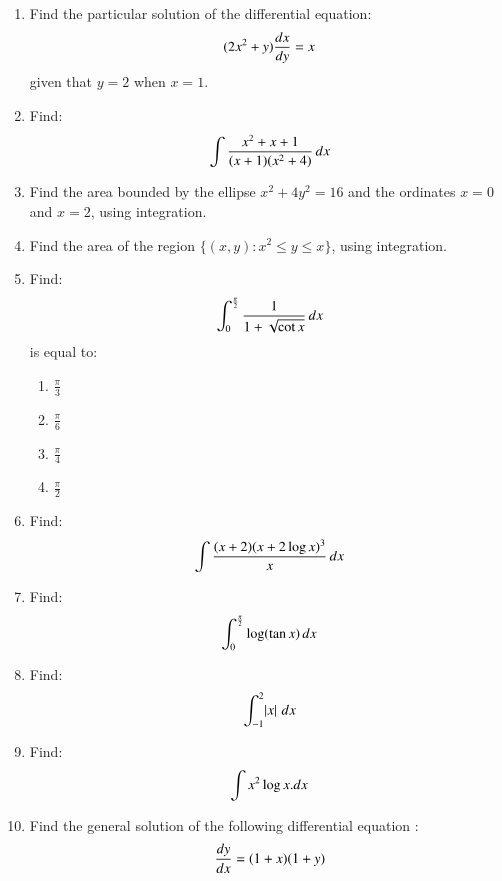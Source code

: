 \documentclass[12pt,-letter paper]{article}
\begin{document}
\begin{enumerate}
\item 
 Find the particular solution of the differential equation:
\begin{align*}
\centering
(2x^2+y) \frac{dx}{dy} = x
\end{align*}
given that $y=2$ when $x=1$.


\item 
Find:
\begin{align*}
\centering
\int \frac{x^2+x+1}{(x+1)(x^2+4)} \, dx
\end{align*}


\item 
 Find the area bounded by the ellipse $x^2+4y^2=16$ and the ordinates $x=0$ and $x=2$, using integration.


\item 
 Find the area of the region $\{(x,y): x^2 \leq y \leq x\}$, using integration.


\item 
Find:
\begin{align*}
\centering
\int_{0}^{\frac{\pi}{2}} \frac{1}{1+\sqrt{\cot x}} \, dx
\end{align*}
 is equal to:
\begin{enumerate}
\item $\frac{\pi}{3}$
\item $\frac{\pi}{6}$
\item $\frac{\pi}{4}$
\item $\frac{\pi}{2}$
\end{enumerate}


\item 
Find:
\begin{align*}
\centering
\int \frac{(x+2)(x+2\log x)^3}{x} \, dx
\end{align*}


\item 
Find:
\begin{align*}
\centering
\int_{0}^{\frac{\pi}{2}} \log(\tan x) \, dx
\end{align*}


\item 
Find:
\begin{align*}
\centering
\int_{-1}^{2} \abs{x}\, dx
\end{align*}


\item 
Find:
\begin{align*}
\centering
\int\limits x^2 \log x . dx
\end{align*}


\item 
Find the general solution of the following differential equation :
\begin{align*}
\centering
\frac{dy}{dx}= (1+x)(1+y)
\end{align*}



\end{enumerate}
\end{document}
